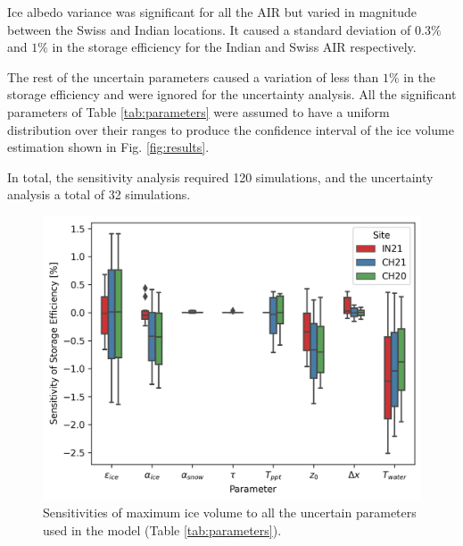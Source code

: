 \documentclass[utf8]{frontiersSCNS} %
\begin{document}
Ice albedo variance was significant for all the AIR but varied in magnitude between the Swiss and Indian locations.
It caused a standard deviation of $0.3\%$ and $1\%$ in the storage efficiency for the Indian and Swiss AIR respectively.

The rest of the uncertain parameters caused a variation of less than $1\%$ in the storage efficiency and were ignored
for the uncertainty analysis. All the significant parameters of Table \ref{tab:parameters} were assumed to have a
uniform distribution over their ranges to produce the confidence interval of the ice volume estimation shown in Fig.
\ref{fig:results}.

In total, the sensitivity analysis required 120 simulations, and the uncertainty analysis a total of 32 simulations.

\begin{figure}[h] 
    \begin{center} 
    \includegraphics[width=10 cm]{Figures/sensitivities.jpg} 
\end{center}
\caption{Sensitivities of maximum ice volume to all the uncertain parameters used in the model (Table
\ref{tab:parameters}). } 
\label{fig:sensitivity} 
\end{figure}


\end{document}
